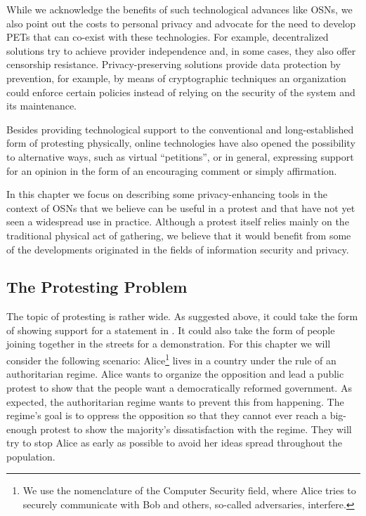 While we acknowledge the benefits of such technological advances like
\acp{OSN}, we also point out the costs to personal privacy and
advocate for the need to develop \acp{PET} that
can co-exist with these technologies. For example, decentralized
solutions try to achieve provider independence and, in some cases,
they also offer censorship resistance. Privacy-preserving solutions
provide data protection by prevention, for example, by means of
cryptographic techniques an organization could enforce certain
policies instead of relying on the security of the system and its
maintenance.

Besides providing technological support to the conventional and
long-established form of protesting physically, online technologies
have also opened the possibility to alternative ways, such as virtual
\enquote{petitions}, or in general, expressing support for an opinion
in the form of an encouraging comment or simply affirmation.

In this chapter we focus on describing some privacy-enhancing tools in
the context of \acp{OSN} that we believe can be useful in a protest
and that have not yet seen a widespread use in practice. Although a
protest itself relies mainly on the traditional physical act of
gathering, we believe that it would benefit from some of the
developments originated in the fields of information security and
privacy.

\subsection{The Protesting Problem}

The topic of protesting is rather wide.
As suggested above, it could take the form of showing support for a statement 
in .
It could also take the form of people joining together in the streets for 
a demonstration.
For this chapter we will consider the following scenario:
Alice\footnote{We use the nomenclature of the Computer Security field,
  where Alice tries to securely communicate with Bob and others,
  so-called adversaries, interfere.} lives in a country under the rule of an authoritarian regime.
Alice wants to organize the opposition and lead a public protest to show that 
the people want a democratically reformed government.
As expected, the authoritarian regime wants to prevent this from happening.
The regime's goal is to oppress the opposition so that they cannot ever reach 
a big-enough protest to show the majority's dissatisfaction with the regime.
They will try to stop Alice as early as possible to avoid her ideas spread 
throughout the population.

